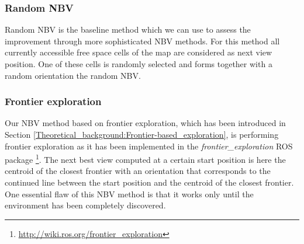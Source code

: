 \documentclass[a4paper,11pt,english]{article}
\begin{document}
\subsubsection{Random NBV}
Random NBV is the baseline method which we can use to assess the improvement through more sophisticated NBV methods.
For this method all currently accessible free space cells of the map are considered as next view position.
One of these cells is randomly selected and forms together with a random orientation the random NBV.

\subsubsection{Frontier exploration}
Our NBV method based on frontier exploration, which has been introduced in Section \ref{Theoretical_background:Frontier-based_exploration}, is performing frontier exploration as it has been implemented in the \textit{frontier\_exploration} ROS package \footnote{\url{http://wiki.ros.org/frontier_exploration}}.
The next best view computed at a certain start position is here the centroid of the closest frontier with an orientation that corresponds to the continued line between the start position and the centroid of the closest frontier.
One essential flaw of this NBV method is that it works only until the environment has been completely discovered. 
\end{document}
